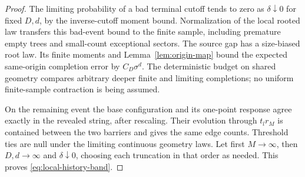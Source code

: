 \documentclass[11pt,letterpaper]{article}
\begin{document}
\begin{proof}
The limiting probability of a bad terminal cutoff tends to zero
as $\delta\downarrow0$ for fixed $D,d$, by the inverse-cutoff
moment bound. Normalization of the local rooted law transfers
this bad-event bound to the finite sample, including premature
empty trees and small-count exceptional sectors. The source gap
has a size-biased root law. Its finite moments and
Lemma~\ref{lem:origin-map} bound the expected same-origin
completion error by $C_D\sigma^d$. The deterministic budget on
shared geometry compares arbitrary deeper finite and limiting
completions; no uniform finite-sample contraction is being assumed.

On the remaining event the base configuration and its one-point
response agree exactly in the revealed string, after rescaling.
Their evolution through $t_lr_M$ is contained between the two
barriers and gives the same edge counts. Threshold ties are null
under the limiting continuous geometry laws. Let first $M\to\infty$,
then $D,d\to\infty$ and $\delta\downarrow0$, choosing each
truncation in that order as needed. This proves
\eqref{eq:local-history-band}.
\end{proof}
\end{document}

